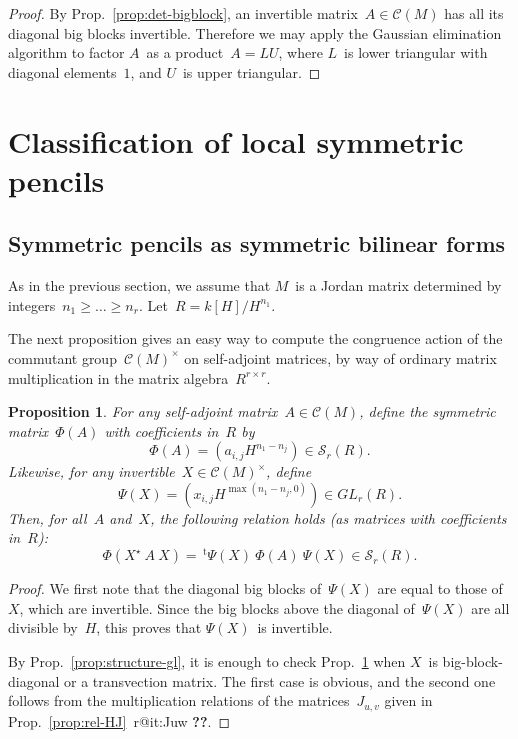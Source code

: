 \documentclass{article}%
\makeatletter
\newtheorem{prop}{Proposition}
\def\labelenumi{(\roman{enumi})}
\def\itemref#1{\expandafter\ifx\csname r@#1\endcsname\relax
  {\bfseries ??}\else{\setcounter{enumi}{\ref{#1}}\labelenumi}\fi}
\let\ro\mathscr
\def\transpose{\,{}^{\mathrm{t}\!}}
\makeatother
\begin{document}
\begin{proof}
By Prop.~\ref{prop:det-bigblock}, an invertible matrix~$A ∈ \ro C(M)$ has
all its diagonal big blocks invertible. Therefore we may apply the
Gaussian elimination algorithm to factor $A$~as a product~$A = LU$, where
$L$~is lower triangular with diagonal elements~$1$, and $U$~is upper
triangular.
\end{proof}

\section{Classification of local symmetric pencils}%
\subsection{Symmetric pencils as symmetric bilinear forms}%

As in the previous section, we assume that $M$~is a Jordan matrix
determined by integers~$n_1 ≥ … ≥ n_r$. Let~$R = k[H]/H^{n_1}$.

The next proposition gives an easy way to compute the congruence action
of the commutant group~$\ro C(M)^{×}$ on self-adjoint matrices, by way of
ordinary matrix multiplication in the matrix algebra~$R^{r×r}$.

\begin{prop}\label{prop:phantom}
For any self-adjoint matrix~$A ∈ \ro C(M)$, define the symmetric
matrix~$Φ(A)$ with coefficients in~$R$ by
\[ Φ(A) = (a_{i,j} H^{n_1 - n_j}) ∈ \ro S_r(R). \]
Likewise, for any invertible~$X ∈ \ro C(M)^{×}$, define
\[ Ψ(X) = (x_{i,j} H^{\max (n_1-n_j, 0)}) ∈ GL_r(R). \]
Then, for all~$A$ and~$X$, the following relation holds (as matrices with
coefficients in~$R$):
\[ Φ(X^{⋆}\:A\:X) = \transpose{Ψ(X)}\: Φ(A)\: Ψ(X) ∈ \ro S_r(R). \]
\end{prop}

\begin{proof}
We first note that the diagonal big blocks of~$Ψ(X)$ are equal to those
of~$X$, which are invertible. Since the big blocks above the diagonal
of~$Ψ(X)$ are all divisible by~$H$, this proves that $Ψ(X)$~is
invertible.

By Prop.~\ref{prop:structure-gl}, it is enough to check
Prop.~\ref{prop:phantom} when $X$~is big-block-diagonal or a transvection
matrix. The first case is obvious, and the second one
follows from the multiplication relations of the matrices~$J_{u,v}$
given in Prop.~\ref{prop:rel-HJ}~\itemref{it:Juw}.
\end{proof}
\end{document}
